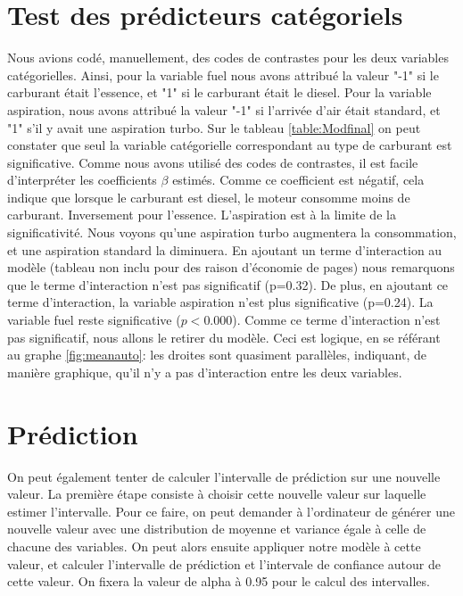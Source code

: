 \documentclass[11pt,a4paper]{article}
\begin{document}
\section{Test des prédicteurs catégoriels}
Nous avions codé, manuellement, des codes de contrastes pour les deux variables catégorielles.
Ainsi, pour la variable fuel nous avons attribué la valeur "-1" si le carburant était l'essence, et "1" si le carburant était le diesel. Pour la variable aspiration, nous avons attribué la valeur "-1" si l'arrivée d'air était standard, et "1" s'il y avait une aspiration turbo.
Sur le tableau \ref{table:Modfinal} on peut constater que seul la variable catégorielle correspondant au type de carburant est significative. Comme nous avons utilisé des codes de contrastes, il est facile d'interpréter les coefficients $\beta$ estimés. Comme ce coefficient est négatif, cela indique que lorsque le carburant est diesel, le moteur consomme moins de carburant. Inversement pour l'essence. L'aspiration est à la limite de la significativité. Nous voyons qu'une aspiration turbo augmentera la consommation, et une aspiration standard la diminuera. 
En ajoutant un terme d'interaction au modèle (tableau non inclu pour des raison d'économie de pages) nous remarquons que le terme d'interaction n'est pas significatif (p=0.32). De plus, en ajoutant ce terme d'interaction, la variable aspiration n'est plus significative (p=0.24). La variable fuel reste significative ($p<0.000$). Comme ce terme d'interaction n'est pas significatif, nous allons le retirer du modèle. Ceci est logique, en se référant au graphe \ref{fig:meanauto}: les droites sont quasiment parallèles, indiquant, de manière graphique, qu'il n'y a pas d'interaction entre les deux variables.

\section{Prédiction}

On peut également tenter de calculer l'intervalle de prédiction sur une nouvelle valeur. La première étape consiste à choisir cette nouvelle valeur sur laquelle estimer l'intervalle. Pour ce faire, on peut demander à l'ordinateur de générer une nouvelle valeur avec une distribution de moyenne et variance égale à celle de chacune des variables. On peut alors ensuite appliquer notre modèle à cette valeur, et calculer l'intervalle de prédiction et l'intervale de confiance autour de cette valeur. On fixera la valeur de alpha à 0.95 pour le calcul des intervalles.
\end{document}
